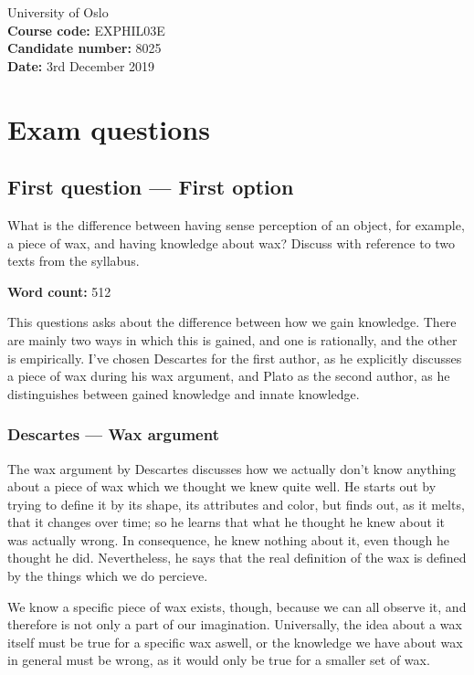 \documentclass{article}
\begin{document}
	\begin{flushright}
		University of Oslo
		\\\textbf{Course code:} EXPHIL03E
		\\\textbf{Candidate number:} 8025
		\\\textbf{Date:} 3rd December 2019
	\end{flushright}

\section*{Exam questions}
	

\subsection*{First question --- First option}
	    What is the difference between having sense perception of an object, for example, a piece of wax, and having knowledge about wax? Discuss with reference to two texts from the syllabus.

	\begin{flushright}
		\textbf{Word count:} 512
	\end{flushright}

	This questions asks about the difference between how we gain knowledge. There are mainly two ways in which this is gained, and one is rationally, and the other is empirically. I've chosen Descartes for the first author, as he explicitly discusses a piece of wax during his wax argument, and Plato as the second author, as he distinguishes between gained knowledge and innate knowledge. 
	
	\subsubsection*{Descartes --- Wax argument}
		The wax argument by Descartes discusses how we actually don't know anything about a piece of wax which we thought we knew quite well. He starts out by trying to define it by its shape, its attributes and color, but finds out, as it melts, that it changes over time; so he learns that what he thought he knew about it was actually wrong. In consequence, he knew nothing about it, even though he thought he did. Nevertheless, he says that the real definition of the wax is defined by the things which we do percieve. 

		We know a specific piece of wax exists, though, because we can all observe it, and therefore is not only a part of our imagination. Universally, the idea about a wax itself must be true for a specific wax aswell, or the knowledge we have about wax in general must be wrong, as it would only be true for a smaller set of wax.
\end{document}
